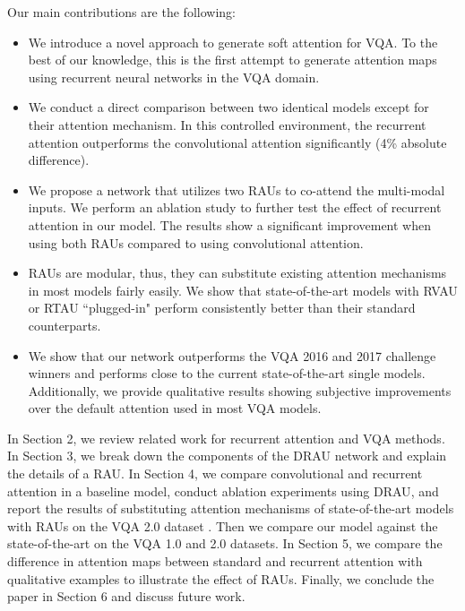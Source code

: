 \documentclass[times,twocolumn, final ,authoryear]{elsarticle}
\begin{document}
  Our main contributions are the following:
  \begin{itemize}
  	\item We introduce a novel approach to generate soft attention for VQA. To the best of our knowledge, this is the first attempt to generate attention maps using recurrent neural networks in the VQA domain.
  	
  	\item We conduct a direct comparison between two identical models except for their attention mechanism. In this controlled environment, the recurrent attention outperforms the convolutional attention significantly (4\% absolute difference). 
  	
  	\item We propose a network that utilizes two \acp{RAU} to co-attend the multi-modal inputs. We perform an ablation study to further test the effect of recurrent attention in our model. The results show a significant improvement when using both \acp{RAU} compared to using convolutional attention.
  	
  	\item   \acp{RAU} are modular, thus, they can substitute existing attention mechanisms in most models fairly easily. We show that state-of-the-art models with RVAU or RTAU ``plugged-in" perform consistently better than their standard counterparts.
  	
  	\item  We show that our network outperforms the  VQA 2016 and 2017 challenge winners and performs close to the current state-of-the-art single models. Additionally, we provide qualitative results showing subjective improvements over the default attention used in most VQA models.
  \end{itemize}
  
  In Section 2, we review related work for recurrent attention and VQA methods. In Section 3, we break down the components of the DRAU network and explain the details of a \ac{RAU}. In Section 4, we compare convolutional and recurrent attention in a baseline model, conduct ablation experiments using \ac{DRAU}, and report the results of substituting attention mechanisms of state-of-the-art models with \acp{RAU} on the VQA 2.0 dataset \citep{goyal2016}. Then we compare our model against the state-of-the-art on the VQA 1.0 \citep{antol2015} and 2.0 datasets. In Section 5, we compare the difference in attention maps between standard and recurrent attention with qualitative examples to illustrate the effect of RAUs. Finally, we conclude the paper in Section 6 and discuss future work.
  
\end{document}
